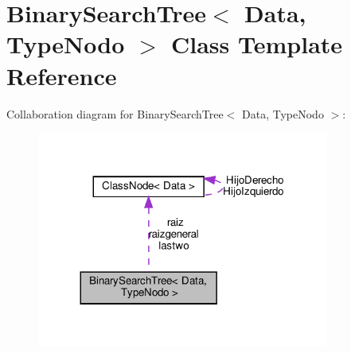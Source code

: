 \hypertarget{class_binary_search_tree}{}\section{Binary\+Search\+Tree$<$ Data, Type\+Nodo $>$ Class Template Reference}
\label{class_binary_search_tree}


Collaboration diagram for Binary\+Search\+Tree$<$ Data, Type\+Nodo $>$\+:
\nopagebreak
\begin{figure}[H]
\begin{center}
\leavevmode
\includegraphics[width=272pt]{class_binary_search_tree__coll__graph}
\end{center}
\end{figure}
